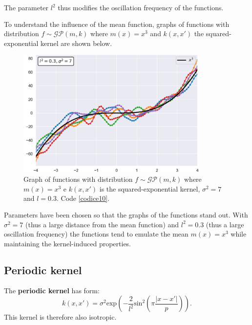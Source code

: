 The parameter $l^2$ thus modifies the oscillation frequency of the functions.

\newpage

To understand the influence of the mean function, graphs of functions with distribution $f\sim \mathcal{GP}(m,k)$ where $m(x)=x^3$ and $k(x,x')$ the squared-exponential kernel are shown below.
\begin{figure}[h]
    \centering
    \includegraphics[width=0.85\textwidth]{images/Gaussian process/RBF - cubedmean.pdf}
    \caption{Graph of functions with distribution  $f\sim \mathcal{GP}(m,k)$ where $m(x)=x^3$ e $k(x,x')$ is the squared-exponential kernel, $\sigma^2=7$ and $l=0.3$. Code \ref{codice10}.}
    \label{10 sample exponential kernel cubed mean}
\end{figure}

Parameters have been chosen so that the graphs of the functions stand out. With $\sigma^2=7$ (thus a large distance from the mean function) and $l^2=0.3$ (thus a large oscillation frequency) the functions tend to emulate the mean $m(x)=x^3$ while maintaining the kernel-induced properties.

\newpage








\newpage

\subsection{Periodic kernel}

\begin{defi}
  The \textbf{periodic kernel} has form:
\[
k(x,x')=\sigma^2 \text{exp}\left( -\frac{2}{l^2} \text{sin}^2\left( \pi \frac{|x-x'|}{p}\right)\right).
\]
This kernel is therefore also isotropic.
\end{defi}

